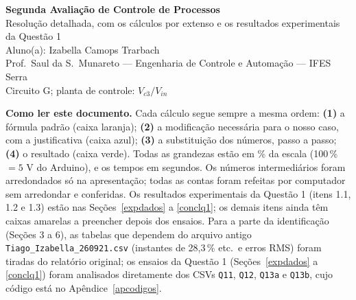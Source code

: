 \documentclass[11pt,a4paper]{article}
\newcommand{\Vc}[1]{V_{c#1}}
\newcommand{\Vin}{V_{in}}
\begin{document}
\begin{center}
{\LARGE\bfseries Segunda Avaliação de Controle de Processos}\\[4pt]
{\Large Resolução detalhada, com os cálculos por extenso e os resultados experimentais da Questão 1}\\[8pt]
Aluno(a): Izabella Camops Trarbach\\
Prof.\ Saul da S.\ Munareto --- Engenharia de Controle e Automação --- IFES Serra\\
Circuito G; planta de controle: $\Vc3/\Vin$
\end{center}

\begin{tcolorbox}[colback=gray!6,colframe=gray!60]
\textbf{Como ler este documento.} Cada cálculo segue sempre a mesma ordem:
\textbf{(1)} a fórmula padrão (caixa laranja); \textbf{(2)} a modificação necessária para o nosso caso, com a justificativa (caixa azul);
\textbf{(3)} a substituição dos números, passo a passo; \textbf{(4)} o resultado (caixa verde).
Todas as grandezas estão em \% da escala (100\,\% $=5$ V do Arduino), e os tempos em segundos.
Os números intermediários foram arredondados só na apresentação; todas as contas foram refeitas por computador sem arredondar e conferidas.
Os resultados experimentais da Questão 1 (itens 1.1, 1.2 e 1.3) estão nas Seções~\ref{expdados} a \ref{conclq1}; os demais itens ainda têm caixas amarelas a preencher depois dos ensaios.
Para a parte da identificação (Seções 3 a 6), as tabelas que dependem do arquivo antigo \texttt{Tiago\_Izabella\_260921.csv} (instantes de 28,3\,\% etc.\ e erros RMS) foram tiradas do relatório original; os ensaios da Questão 1 (Seções~\ref{expdados} a \ref{conclq1}) foram analisados diretamente dos CSVs \texttt{Q11}, \texttt{Q12}, \texttt{Q13a} e \texttt{Q13b}, cujo código está no Apêndice~\ref{apcodigos}.
\end{tcolorbox}

\tableofcontents
\newpage






\end{document}
